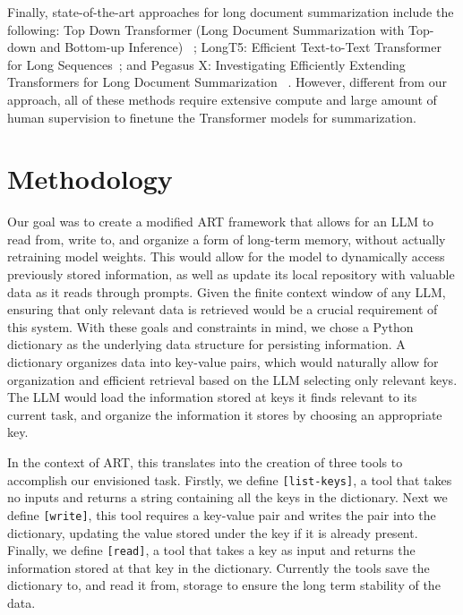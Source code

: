 \documentclass{article}
\begin{document}
Finally, state-of-the-art approaches for long document summarization include the following: Top Down Transformer (Long Document Summarization with Top-down and Bottom-up Inference) ~\cite{pang2022long}; LongT5: Efficient Text-to-Text Transformer for Long Sequences~\cite{guo2022longt5}; and Pegasus X: Investigating Efficiently Extending Transformers for Long Document Summarization ~\cite{phang2022investigating}.
However, different from our approach, all of these methods require extensive compute and large amount of human supervision to finetune the Transformer models for summarization.



\section{Methodology}



Our goal was to create a modified ART framework that allows for an LLM to read from, write to, and organize a form of long-term memory, without actually retraining model weights.
This would allow for the model to dynamically access previously stored information, as well as update its local repository with valuable data as it reads through prompts.
Given the finite context window of any LLM, ensuring that only relevant data is retrieved would be a crucial requirement of this system.
With these goals and constraints in mind, we chose a Python dictionary as the underlying data structure for persisting information.
A dictionary organizes data into key-value pairs, which would naturally allow for organization and efficient retrieval based on the LLM selecting only relevant keys.
The LLM would load the information stored at keys it finds relevant to its current task, and organize the information it stores by choosing an appropriate key.

In the context of ART, this translates into the creation of three tools to accomplish our envisioned task. Firstly, we define \texttt{[list-keys]}, a tool that takes no inputs and returns a string containing all the keys in the dictionary.
Next we define \texttt{[write]}, this tool requires a key-value pair and writes the pair into the dictionary, updating the value stored under the key if it is already present.
Finally, we define \texttt{[read]}, a tool that takes a key as input and returns the information stored at that key in the dictionary.
Currently the tools save the dictionary to, and read it from, storage to ensure the long term stability of the data.
\end{document}
